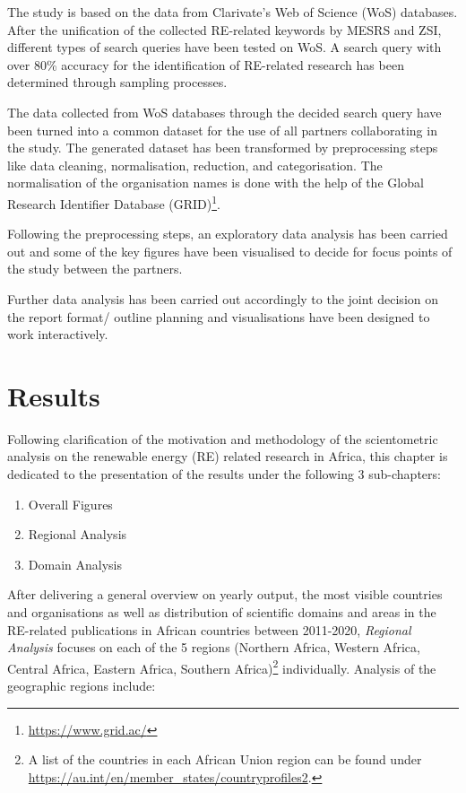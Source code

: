 \documentclass[
]{book}
\providecommand{\tightlist}{%
  \setlength{\itemsep}{0pt}\setlength{\parskip}{0pt}}
\renewcommand{\href}[2]{#2\footnote{\url{#1}}}
\begin{document}
The study is based on the data from Clarivate's Web of Science (WoS) databases. After the unification of the collected RE-related keywords by MESRS and ZSI, different types of search queries have been tested on WoS. A search query with over 80\% accuracy for the identification of RE-related research has been determined through sampling processes.

The data collected from WoS databases through the decided search query have been turned into a common dataset for the use of all partners collaborating in the study. The generated dataset has been transformed by preprocessing steps like data cleaning, normalisation, reduction, and categorisation. The normalisation of the organisation names is done with the help of the \href{https://www.grid.ac/}{Global Research Identifier Database (GRID)}.

Following the preprocessing steps, an exploratory data analysis has been carried out and some of the key figures have been visualised to decide for focus points of the study between the partners.

Further data analysis has been carried out accordingly to the joint decision on the report format/ outline planning and visualisations have been designed to work interactively.

\hypertarget{results}{%
\chapter{Results}\label{results}}

Following clarification of the motivation and methodology of the
scientometric analysis on the renewable energy (RE) related research in Africa,
this chapter is dedicated to the presentation of the results under the following
3 sub-chapters:

\begin{enumerate}
\def\labelenumi{\arabic{enumi}.}
\tightlist
\item
  Overall Figures
\item
  Regional Analysis
\item
  Domain Analysis
\end{enumerate}

After delivering a general overview on yearly output, the most visible
countries and organisations as well as distribution of scientific domains and
areas in the RE-related publications in African countries between 2011-2020, \emph{Regional
Analysis} focuses on each of the 5 regions (Northern Africa, Western Africa, Central Africa,
Eastern Africa, Southern Africa)\footnote{A list of the countries in each African Union region can
  be found under \url{https://au.int/en/member_states/countryprofiles2}.} individually. Analysis of the geographic regions
include:
\end{document}
